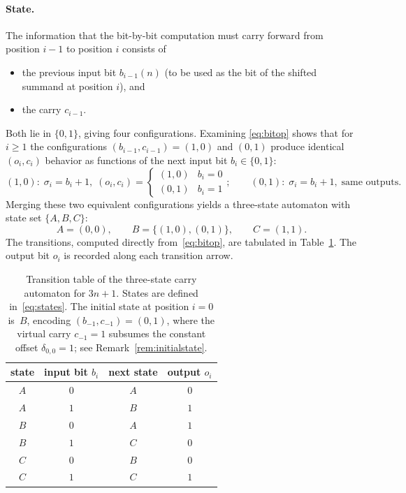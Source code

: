 \documentclass[11pt,a4paper]{article}
\theoremstyle{definition}
\theoremstyle{remark}
\begin{document}
\paragraph{State.}
The information that the bit-by-bit computation must carry forward from
position $i-1$ to position $i$ consists of
\begin{itemize}[leftmargin=2em]
  \item the previous input bit $b_{i-1}(n)$ (to be used as the bit of
    the shifted summand at position $i$), and
  \item the carry $c_{i-1}$.
\end{itemize}
Both lie in $\{0, 1\}$, giving four configurations.  Examining
\eqref{eq:bitop} shows that for $i \geq 1$ the configurations
$(b_{i-1}, c_{i-1}) = (1, 0)$ and $(0, 1)$ produce identical
$(o_i, c_i)$ behavior as functions of the next input bit
$b_i \in \{0, 1\}$:
\[
  (1, 0) \colon\; \sigma_i = b_i + 1, \;
  (o_i, c_i) =
  \begin{cases}(1, 0) & b_i = 0 \\ (0, 1) & b_i = 1\end{cases};
  \qquad
  (0, 1) \colon\; \sigma_i = b_i + 1, \; \text{same outputs}.
\]
Merging these two equivalent configurations yields a three-state
automaton with state set $\{A, B, C\}$:
\begin{equation}\label{eq:states}
  A = (0, 0), \qquad B = \{(1, 0), (0, 1)\}, \qquad C = (1, 1).
\end{equation}
The transitions, computed directly from~\eqref{eq:bitop}, are tabulated
in Table~\ref{tab:trans}.  The output bit $o_i$ is recorded along each
transition arrow.

\begin{table}[htbp]
\centering
\renewcommand{\arraystretch}{1.15}
\begin{tabular}{c c c c}
\toprule
state & input bit $b_i$ & next state & output $o_i$ \\
\midrule
$A$ & $0$ & $A$ & $0$ \\
$A$ & $1$ & $B$ & $1$ \\
$B$ & $0$ & $A$ & $1$ \\
$B$ & $1$ & $C$ & $0$ \\
$C$ & $0$ & $B$ & $0$ \\
$C$ & $1$ & $C$ & $1$ \\
\bottomrule
\end{tabular}
\caption{Transition table of the three-state carry automaton for
$3n + 1$.  States are defined in~\eqref{eq:states}.  The initial state
at position $i = 0$ is~$B$, encoding $(b_{-1}, c_{-1}) = (0, 1)$, where
the virtual carry $c_{-1} = 1$ subsumes the constant offset
$\delta_{0,0} = 1$; see Remark~\ref{rem:initialstate}.}
\label{tab:trans}
\end{table}
\end{document}
